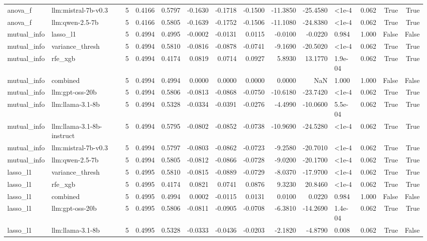 \begin{tabular}{llrrrrrrrrllrr}
anova_f & llm:mistral-7b-v0.3 & 5 & 0.4166 & 0.5797 & -0.1630 & -0.1718 & -0.1500 & -11.3850 & -25.4580 & <1e-4 & 0.062 & True & True \\
anova_f & llm:qwen-2.5-7b & 5 & 0.4166 & 0.5805 & -0.1639 & -0.1752 & -0.1506 & -11.1080 & -24.8380 & <1e-4 & 0.062 & True & True \\
mutual_info & lasso_l1 & 5 & 0.4994 & 0.4995 & -0.0002 & -0.0131 & 0.0115 & -0.0100 & -0.0220 & 0.984 & 1.000 & False & False \\
mutual_info & variance_thresh & 5 & 0.4994 & 0.5810 & -0.0816 & -0.0878 & -0.0741 & -9.1690 & -20.5020 & <1e-4 & 0.062 & True & True \\
mutual_info & rfe_xgb & 5 & 0.4994 & 0.4174 & 0.0819 & 0.0714 & 0.0927 & 5.8930 & 13.1770 & 1.9e-04 & 0.062 & True & True \\
mutual_info & combined & 5 & 0.4994 & 0.4994 & 0.0000 & 0.0000 & 0.0000 & 0.0000 & NaN & 1.000 & 1.000 & False & False \\
mutual_info & llm:gpt-oss-20b & 5 & 0.4994 & 0.5806 & -0.0813 & -0.0868 & -0.0750 & -10.6180 & -23.7420 & <1e-4 & 0.062 & True & True \\
mutual_info & llm:llama-3.1-8b & 5 & 0.4994 & 0.5328 & -0.0334 & -0.0391 & -0.0276 & -4.4990 & -10.0600 & 5.5e-04 & 0.062 & True & True \\
mutual_info & llm:llama-3.1-8b-instruct & 5 & 0.4994 & 0.5795 & -0.0802 & -0.0852 & -0.0738 & -10.9690 & -24.5280 & <1e-4 & 0.062 & True & True \\
mutual_info & llm:mistral-7b-v0.3 & 5 & 0.4994 & 0.5797 & -0.0803 & -0.0862 & -0.0723 & -9.2580 & -20.7010 & <1e-4 & 0.062 & True & True \\
mutual_info & llm:qwen-2.5-7b & 5 & 0.4994 & 0.5805 & -0.0812 & -0.0866 & -0.0728 & -9.0200 & -20.1700 & <1e-4 & 0.062 & True & True \\
lasso_l1 & variance_thresh & 5 & 0.4995 & 0.5810 & -0.0815 & -0.0889 & -0.0729 & -8.0370 & -17.9700 & <1e-4 & 0.062 & True & True \\
lasso_l1 & rfe_xgb & 5 & 0.4995 & 0.4174 & 0.0821 & 0.0741 & 0.0876 & 9.3230 & 20.8460 & <1e-4 & 0.062 & True & True \\
lasso_l1 & combined & 5 & 0.4995 & 0.4994 & 0.0002 & -0.0115 & 0.0131 & 0.0100 & 0.0220 & 0.984 & 1.000 & False & False \\
lasso_l1 & llm:gpt-oss-20b & 5 & 0.4995 & 0.5806 & -0.0811 & -0.0905 & -0.0708 & -6.3810 & -14.2690 & 1.4e-04 & 0.062 & True & True \\
lasso_l1 & llm:llama-3.1-8b & 5 & 0.4995 & 0.5328 & -0.0333 & -0.0436 & -0.0203 & -2.1820 & -4.8790 & 0.008 & 0.062 & True & False \\

\end{tabular}
